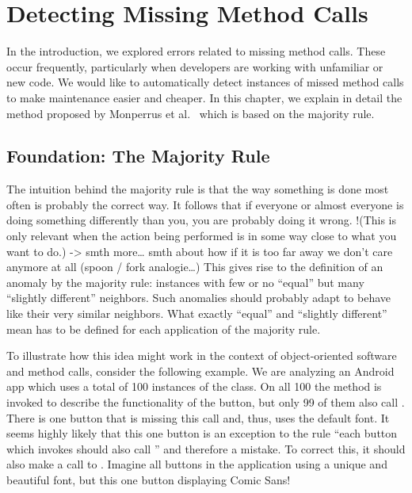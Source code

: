 \chapter{Detecting Missing Method Calls}\label{ch:dmmc}

In the introduction, we explored errors related to missing method calls.
These occur frequently, particularly when developers are working with unfamiliar or new code.
We would like to automatically detect instances of missed method calls to make maintenance easier and cheaper.
In this chapter, we explain in detail the method proposed by Monperrus et al.~\cite{monperrus2010detecting}\cite{monperrus2013detecting} which is based on the majority rule.

\section{Foundation: The Majority Rule}\label{sec:majority}

The intuition behind the majority rule is that the way something is done most often is probably the correct way.
It follows that if everyone or almost everyone is doing something differently than you, you are probably doing it wrong.
\todo!{(This is only relevant when the action being performed is in some way close to what you want to do.) -> smth more\ldots
    smth about how if it is too far away we don't care anymore at all (spoon / fork analogie\ldots)
}
This gives rise to the definition of an anomaly by the majority rule: instances with few or no ``equal'' but many ``slightly different'' neighbors.
Such anomalies should probably adapt to behave like their very similar neighbors.
What exactly ``equal'' and ``slightly different'' mean has to be defined for each application of the majority rule.

To illustrate how this idea might work in the context of object-oriented software and method calls, consider the following example.
We are analyzing an Android app which uses a total of 100 instances of the  class.
On all 100 the method  is invoked to describe the functionality of the button, but only 99 of them also call .
There is one button that is missing this call and, thus, uses the default font.
It seems highly likely that this one button is an exception to the rule ``each button which invokes  should also call '' and therefore a mistake.
To correct this, it should also make a call to .
Imagine all buttons in the application using a unique and beautiful font, but this one button displaying Comic Sans!


